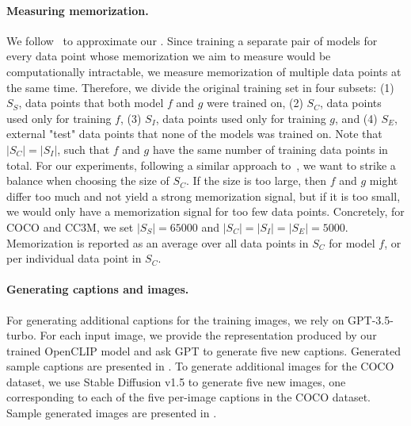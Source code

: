 \paragraph{Measuring memorization.} We follow~\citet{wang2024memorization} to approximate our \ours. Since training a separate pair of models for every data point whose memorization we aim to measure would be computationally intractable, we measure memorization of multiple data points at the same time. Therefore, we divide the original training set in four subsets: (1) $S_S$, data points that both model $f$ and $g$ were trained on, (2) $S_C$, data points used only for training $f$, (3) $S_I$, data points used only for training $g$, and (4) $S_E$, external "test" data points that none of the models was trained on.
Note that $|S_C|=|S_I|$, such that $f$ and $g$ have the same number of training data points in total. 
For our experiments, following a similar approach to~\citet{wang2024memorization}, we want to strike a balance when choosing the size of $S_C$. If the size is too large, then $f$ and $g$ might differ too much and not yield a strong memorization signal, but if it is too small, we would only have a memorization signal for too few data points.
Concretely, for COCO and CC3M, we set $|S_S|=65000$ and $|S_C|=|S_I|=|S_E|=5000$. Memorization is reported as an average over all data points in $S_C$ for model $f$, or per individual data point in $S_C$.

\paragraph{Generating captions and images.}
For generating additional captions for the training images, we rely on GPT-3.5-turbo. For each input image, we provide the representation produced by our trained OpenCLIP model and ask GPT to generate five new captions.
Generated sample captions are presented in . 
To generate additional images for the COCO dataset, we use Stable Diffusion v1.5 to generate five new images, one corresponding to each of the five per-image captions in the COCO dataset. Sample generated images are presented in .

